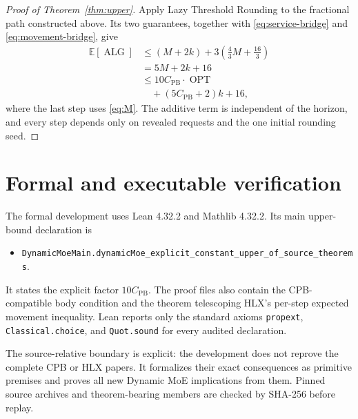 \documentclass[11pt]{article}
\theoremstyle{remark}
\newcommand{\E}{\mathbb E}
\newcommand{\OPT}{\operatorname{OPT}}
\newcommand{\ALG}{\operatorname{ALG}}
\newcommand{\CPB}{C_{\mathrm{PB}}}
\begin{document}
\begin{proof}[Proof of Theorem~\ref{thm:upper}]
Apply Lazy Threshold Rounding to the fractional path constructed above.  Its
two guarantees, together with \eqref{eq:service-bridge} and
\eqref{eq:movement-bridge}, give
\begin{align*}
 \E[\ALG]
 &\leq (M+2k)+3\left(\frac43M+\frac{16}{3}\right)\\
 &=5M+2k+16\\
 &\leq10\CPB\cdot\OPT\\
 &\quad +(5\CPB+2)k+16,
\end{align*}
where the last step uses \eqref{eq:M}.  The additive term is independent of the
horizon, and every step depends only on revealed requests and the one initial
rounding seed.
\end{proof}

\section{Formal and executable verification}

The formal development uses Lean 4.32.2 and Mathlib 4.32.2.  Its main
upper-bound declaration is
\begin{itemize}
\item
\texttt{DynamicMoeMain.dynamicMoe\_explicit\_constant\_upper\_of\_source\_theorems}.
\end{itemize}
It states the explicit factor $10\CPB$.  The proof files also contain the
CPB-compatible body condition and the theorem telescoping HLX's per-step
expected movement inequality.  Lean reports only the standard axioms
\texttt{propext}, \texttt{Classical.choice}, and \texttt{Quot.sound} for every
audited declaration.

The source-relative boundary is explicit: the development does not reprove the
complete CPB or HLX papers.  It formalizes their exact consequences as primitive
premises and proves all new Dynamic MoE implications from them.  Pinned source
archives and theorem-bearing members are checked by SHA-256 before replay.
\end{document}
